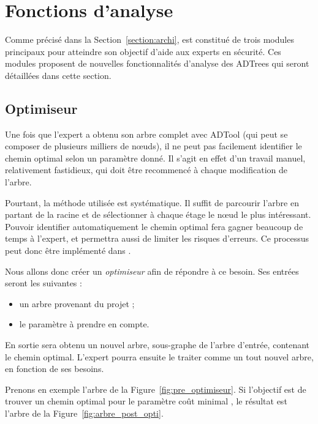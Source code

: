 \section{Fonctions d'analyse}
	
	Comme précisé dans la {\sc Section}~\ref{section:archi}, \glasir{} est constitué de trois modules principaux pour atteindre son objectif d'aide aux experts en sécurité. Ces modules proposent de nouvelles fonctionnalités d'analyse des ADTrees qui seront détaillées dans cette section. 

	\subsection{Optimiseur}
		\label{subsection:optimiseur}

		Une fois que l'expert a obtenu son arbre complet avec ADTool (qui peut se composer de plusieurs milliers de nœuds), il ne peut pas facilement identifier le chemin optimal selon un paramètre donné. Il s'agit en effet d'un travail manuel, relativement fastidieux, qui doit être recommencé à chaque modification de l'arbre.
		
		Pourtant, la méthode utilisée est systématique. Il suffit de parcourir l'arbre en partant de la racine et de sélectionner à chaque étage le nœud le plus intéressant. Pouvoir identifier automatiquement le chemin optimal fera gagner beaucoup de temps à l'expert, et permettra aussi de limiter les risques d'erreurs. Ce processus peut donc être implémenté dans \glasir{}. 

		Nous allons donc créer un \textit{optimiseur} afin de répondre à ce besoin.
		Ses entrées seront les suivantes :
		\begin{itemize}
			\item un arbre provenant du projet ;
			\item le paramètre à prendre en compte.
		\end{itemize}
		En sortie sera obtenu un nouvel arbre, sous-graphe de l'arbre d'entrée, contenant le chemin optimal. L'expert pourra ensuite le traiter comme un tout nouvel arbre, en fonction de ses besoins.
		
		Prenons en exemple l'arbre de la {\sc Figure}~\ref{fig:pre_optimiseur}. Si l'objectif est de trouver un chemin optimal pour le paramètre \og coût minimal \fg{}, le résultat est l'arbre de la {\sc Figure}~\ref{fig:arbre_post_opti}.
		
